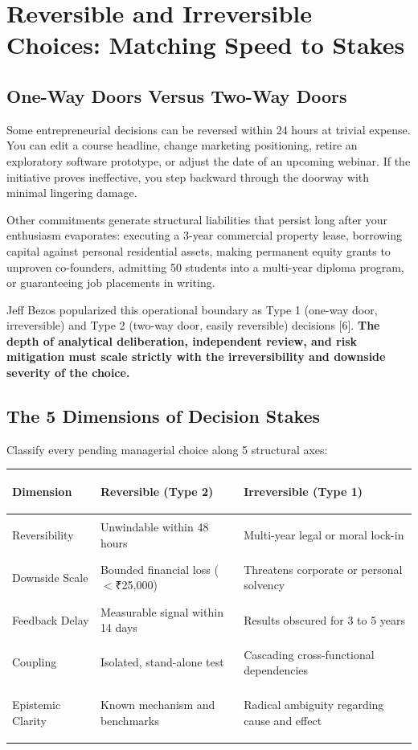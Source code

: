 \section{Reversible and Irreversible Choices: Matching Speed to Stakes}

\subsection{One-Way Doors Versus Two-Way Doors}

Some entrepreneurial decisions can be reversed within 24 hours at trivial expense. You can edit a course headline, change marketing positioning, retire an exploratory software prototype, or adjust the date of an upcoming webinar. If the initiative proves ineffective, you step backward through the doorway with minimal lingering damage.

Other commitments generate structural liabilities that persist long after your enthusiasm evaporates: executing a 3-year commercial property lease, borrowing capital against personal residential assets, making permanent equity grants to unproven co-founders, admitting 50 students into a multi-year diploma program, or guaranteeing job placements in writing.

Jeff Bezos popularized this operational boundary as Type 1 (one-way door, irreversible) and Type 2 (two-way door, easily reversible) decisions [6]. \textbf{The depth of analytical deliberation, independent review, and risk mitigation must scale strictly with the irreversibility and downside severity of the choice.}

\subsection{The 5 Dimensions of Decision Stakes}

Classify every pending managerial choice along 5 structural axes:

\begin{tcolorbox}[
  enhanced,
  colback=BayesSurface!60,
  colframe=BayesBorder,
  boxrule=0.5pt,
  arc=3pt,
  left=3pt,right=3pt,top=3pt,bottom=3pt,
  boxsep=1pt
]
\scriptsize
\begin{tabularx}{\linewidth}{>{\bfseries\raggedright\arraybackslash}p{2.2cm} X X}
\toprule
\textbf{Dimension} & \textbf{Reversible (Type 2)} & \textbf{Irreversible (Type 1)} \\
\midrule
Reversibility & Unwindable within 48 hours & Multi-year legal or moral lock-in \\
\addlinespace[2pt]
Downside Scale & Bounded financial loss ($<$₹25,000) & Threatens corporate or personal solvency \\
\addlinespace[2pt]
Feedback Delay & Measurable signal within 14 days & Results obscured for 3 to 5 years \\
\addlinespace[2pt]
Coupling & Isolated, stand-alone test & Cascading cross-functional dependencies \\
\addlinespace[2pt]
Epistemic Clarity & Known mechanism and benchmarks & Radical ambiguity regarding cause and effect \\
\bottomrule
\end{tabularx}
\end{tcolorbox}

